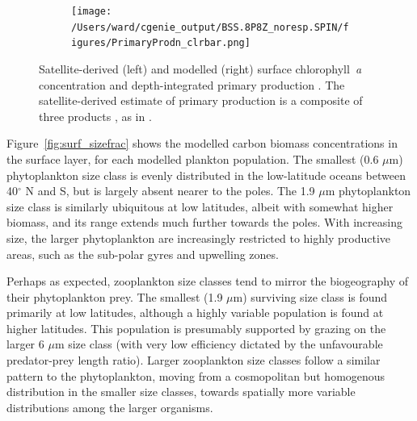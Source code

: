 \documentclass[gmd, manuscript]{copernicus}
\providecommand{\DIFadd}[1]{{\protect\color{blue}\uwave{#1}}} %
\providecommand{\DIFaddFL}[1]{\DIFadd{#1}} %
\providecommand{\DIFaddbeginFL}{} %
\providecommand{\DIFaddendFL}{} %
\providecommand{\DIFdelendFL}{} %
\begin{document}
\begin{figure}[htbp]
\begin{subfigure}{.5\textwidth}
\DIFdelendFL \DIFaddbeginFL \texttt{[image: /Users/ward/cgenie\_output/BSS.8P8Z\_noresp.SPIN/figures/PrimaryProdn\_clrbar.png]}
\DIFaddendFL \end{subfigure}
\caption{Satellite-derived (left) and modelled (right) surface chlorophyll~\textit{a} concentration \DIFaddbeginFL \DIFaddFL{(mg Chl m$^{-3}$) }\DIFaddendFL and depth-integrated primary production \DIFaddbeginFL \DIFaddFL{(mg C m$^{-2}$ d$^{-1}$)}\DIFaddendFL . The satellite-derived estimate of primary production is a composite of three products \citep{Behrenfeld:1997,Carr:2006,Westberry:2008}, as in \citet[][their Figure~12]{Yool:2013a}.}
\label{fig:chl_prpr}
\end{figure}

Figure~\ref{fig:surf_sizefrac} shows the modelled carbon biomass concentrations in the surface layer, for each modelled plankton population. The smallest (0.6 $\mu$m) phytoplankton size class is evenly distributed in the low-latitude oceans between 40$^\circ$ N and S, but is largely absent nearer to the poles. The 1.9 $\mu$m phytoplankton size class is similarly ubiquitous at low latitudes, albeit with somewhat higher biomass, and its range extends much further towards the poles. With increasing size, the larger phytoplankton are increasingly restricted to highly productive areas, such as the sub-polar gyres and upwelling zones. 

Perhaps as expected, zooplankton size classes tend to mirror the biogeography of their phytoplankton prey. The smallest (1.9 $\mu$m) surviving size class is found primarily at low latitudes, although a highly variable population is found at higher latitudes. This population is presumably supported by grazing on the larger 6 $\mu$m size class (with very low efficiency dictated by the unfavourable predator-prey length ratio). Larger zooplankton size classes follow a similar pattern to the phytoplankton, moving from a cosmopolitan but homogenous distribution in the smaller size classes, towards spatially more variable distributions among the larger organisms.
\end{document}
